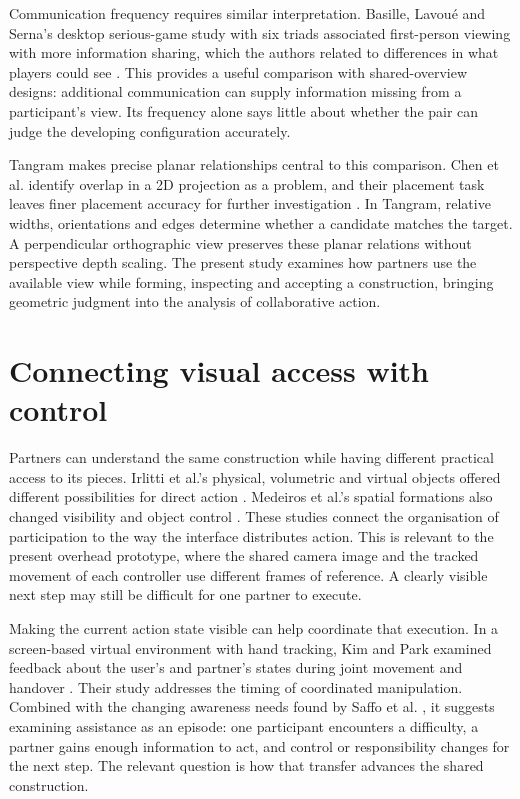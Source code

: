 Communication frequency requires similar interpretation. Basille, Lavou\'e and Serna's desktop serious-game study with six triads associated first-person viewing with more information sharing, which the authors related to differences in what players could see \cite{basille2022}. This provides a useful comparison with shared-overview designs: additional communication can supply information missing from a participant's view. Its frequency alone says little about whether the pair can judge the developing configuration accurately.

Tangram makes precise planar relationships central to this comparison. Chen et al. identify overlap in a 2D projection as a problem, and their placement task leaves finer placement accuracy for further investigation \cite{chen2024}. In Tangram, relative widths, orientations and edges determine whether a candidate matches the target. A perpendicular orthographic view preserves these planar relations without perspective depth scaling. The present study examines how partners use the available view while forming, inspecting and accepting a construction, bringing geometric judgment into the analysis of collaborative action.

\section{Connecting visual access with control}\label{sec:2-3}

Partners can understand the same construction while having different practical access to its pieces. Irlitti et al.'s physical, volumetric and virtual objects offered different possibilities for direct action \cite{irlitti2024}. Medeiros et al.'s spatial formations also changed visibility and object control \cite{medeiros2024}. These studies connect the organisation of participation to the way the interface distributes action. This is relevant to the present overhead prototype, where the shared camera image and the tracked movement of each controller use different frames of reference. A clearly visible next step may still be difficult for one partner to execute.

Making the current action state visible can help coordinate that execution. In a screen-based virtual environment with hand tracking, Kim and Park examined feedback about the user's and partner's states during joint movement and handover \cite{kim2024}. Their study addresses the timing of coordinated manipulation. Combined with the changing awareness needs found by Saffo et al. \cite{saffo2023}, it suggests examining assistance as an episode: one participant encounters a difficulty, a partner gains enough information to act, and control or responsibility changes for the next step. The relevant question is how that transfer advances the shared construction.

